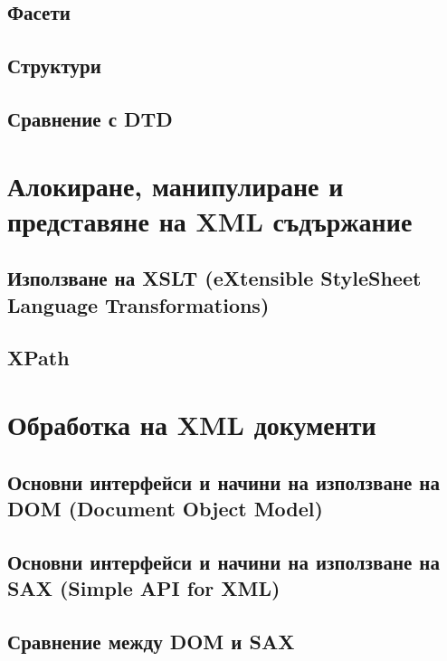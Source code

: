 \documentclass[fleqn,12pt]{article}
\begin{document}
\subsection{Фасети}
\subsection{Структури}
\subsection{Сравнение с DTD}

\section{Алокиране, манипулиране и представяне на XML съдържание}

\subsection{Използване на XSLT (eXtensible StyleSheet Language Transformations)}
\subsection{XPath}

\section{Обработка на XML документи}

\subsection{Основни интерфейси и начини на използване на DOM (Document Object Model)}
\subsection{Основни интерфейси и начини на използване на SAX (Simple API for XML)}
\subsection{Сравнение между DOM и SAX}
\end{document}
